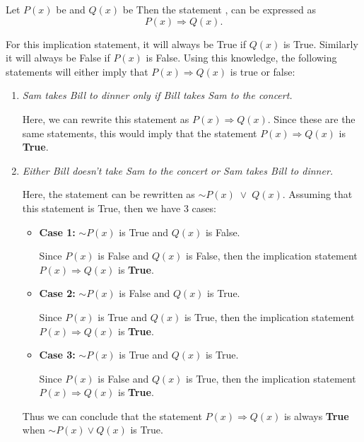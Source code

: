 \documentclass[11pt, oneside]{article}   	%
\begin{document}
Let $P(x)$ be  and $Q(x)$ be  Then the statement , can be expressed as
$$P(x) \Rightarrow Q(x).$$

For this implication statement, it will always be True if $Q(x)$ is True. Similarly it will always be False if $P(x)$ is False. Using this knowledge, the following statements will either imply that $P(x) \Rightarrow Q(x)$ is true or false:

\begin{enumerate}[ (a)]    

    \item \textit{Sam takes Bill to dinner only if Bill takes Sam to the concert.}
    
    Here, we can rewrite this statement as $P(x) \Rightarrow Q(x)$. Since these are the same statements, this would imply that the statement $P(x) \Rightarrow Q(x)$ is \textbf{True}.
    
    \item \textit{Either Bill doesn't take Sam to the concert or Sam takes Bill to dinner.}
    
    Here, the statement can be rewritten as $\sim P(x) \; \vee \; Q(x)$. Assuming that this statement is True, then we have 3 cases:
   
    \begin{itemize}
    \item \textbf{Case 1:} $\sim P(x)$ is True and $Q(x)$ is False.
    
    Since $P(x)$ is False and $Q(x)$ is False, then the implication statement $P(x) \Rightarrow Q(x)$ is \textbf{True}.
    
    \item \textbf{Case 2:} $\sim P(x)$ is False and $Q(x)$ is True.
    
    Since $P(x) $ is True and $Q(x)$ is True, then the implication statement $P(x) \Rightarrow Q(x)$ is \textbf{True}.
    
    \item \textbf{Case 3:} $\sim P(x)$ is True and $Q(x)$ is True.
    
    Since $P(x) $ is False and $Q(x)$ is True, then the implication statement $P(x) \Rightarrow Q(x)$ is \textbf{True}.
    \end{itemize}
    
    Thus we can conclude that the statement $P(x) \Rightarrow Q(x)$ is always \textbf{True} when $\sim P(x) \vee Q(x)$ is True.
    

\end{enumerate}
\end{document}
